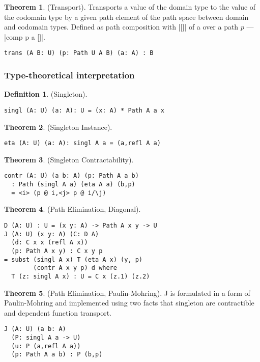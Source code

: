 \documentclass[twocolumn,10pt]{article}
\theoremstyle{definition}
\newtheorem{theorem}{Theorem}
\newtheorem{definition}{Definition}
\begin{document}
\begin{theorem} (Transport).
Transports a value of the domain type to the value of the codomain type
by a given path element of the path space between domain and codomain types.
Defined as path composition with |[]| of a over a path $p$ --- |comp p a []|.
\begin{lstlisting}
trans (A B: U) (p: Path U A B) (a: A) : B
\end{lstlisting}
\end{theorem}

\subsubsection*{Type-theoretical interpretation}
\begin{definition} (Singleton).
\begin{lstlisting}
singl (A: U) (a: A): U = (x: A) * Path A a x
\end{lstlisting}
\end{definition}

\begin{theorem} (Singleton Instance).
\begin{lstlisting}
eta (A: U) (a: A): singl A a = (a,refl A a)
\end{lstlisting}
\end{theorem}

\begin{theorem} (Singleton Contractability).
\begin{lstlisting}
contr (A: U) (a b: A) (p: Path A a b)
  : Path (singl A a) (eta A a) (b,p)
  = <i> (p @ i,<j> p @ i/\j)
\end{lstlisting}
\end{theorem}

\begin{theorem} (Path Elimination, Diagonal).
\begin{lstlisting}
D (A: U) : U = (x y: A) -> Path A x y -> U
J (A: U) (x y: A) (C: D A)
  (d: C x x (refl A x))
  (p: Path A x y) : C x y p
= subst (singl A x) T (eta A x) (y, p)
        (contr A x y p) d where
  T (z: singl A x) : U = C x (z.1) (z.2)
\end{lstlisting}
\end{theorem}

\begin{theorem} (Path Elimination, Paulin-Mohring).
J is formulated in a form of Paulin-Mohring and implemented using
two facts that singleton are contractible and dependent function
transport.
\begin{lstlisting}
J (A: U) (a b: A)
  (P: singl A a -> U)
  (u: P (a,refl A a))
  (p: Path A a b) : P (b,p)
\end{lstlisting}
\end{theorem}
\end{document}
